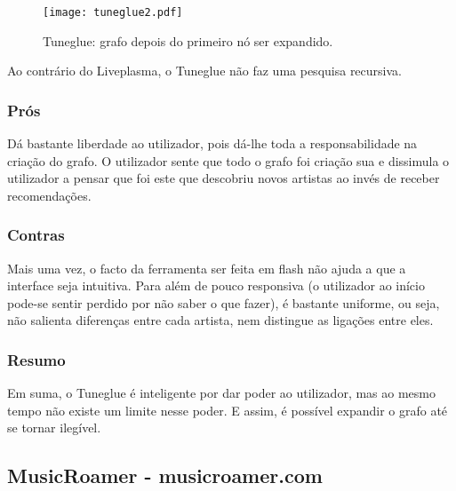 \begin{figure}[tb]
  \begin{center}
    \texttt{[image: tuneglue2.pdf]}
  \end{center}
  \caption{Tuneglue: grafo depois do primeiro nó ser expandido.}
  \label{fig:sota_tuneglue2}
\end{figure}

Ao contrário do Liveplasma, o Tuneglue não faz uma pesquisa recursiva.

\subsubsection{Prós} %
\label{ssub:audiomap_pros}

Dá bastante liberdade ao utilizador, pois dá-lhe toda a responsabilidade na criação do grafo.
O utilizador sente que todo o grafo foi criação sua e dissimula o utilizador a pensar que foi este que descobriu novos artistas ao invés de receber recomendações.


\subsubsection{Contras} %
\label{ssub:audiomap_contras}

Mais uma vez, o facto da ferramenta ser feita em flash não ajuda a que a interface seja intuitiva.
Para além de pouco responsiva (o utilizador ao início pode-se sentir perdido por não saber o que fazer), é bastante uniforme, ou seja, não salienta diferenças entre cada artista, nem distingue as ligações entre eles.


\subsubsection{Resumo} %
\label{ssub:audiomap_resumo}

Em suma, o Tuneglue é inteligente por dar poder ao utilizador, mas ao mesmo tempo não existe um limite nesse poder.
E assim, é possível expandir o grafo até se tornar ilegível.





\subsection{MusicRoamer - musicroamer.com} %
\label{sub:musicroamer}

